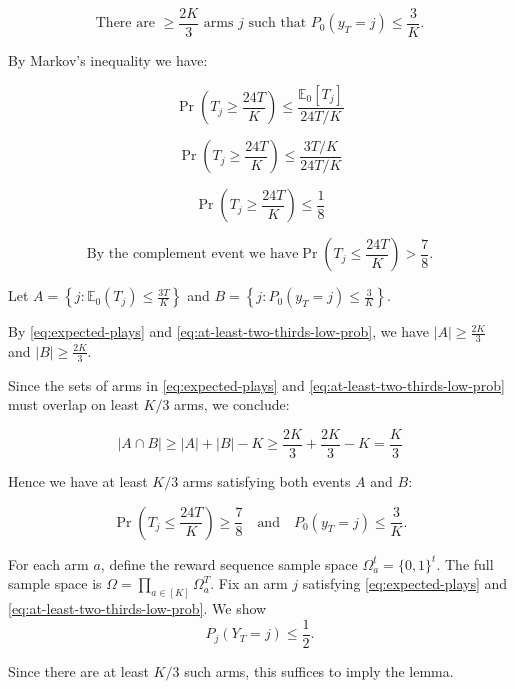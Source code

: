 \documentclass[12pt]{article}
\begin{document}
\begin{equation}
\text{There are } \ge \frac{2K}{3} \text{ arms } j \text{ such that } 
P_0(y_T = j) \le \frac{3}{K}.
\label{eq:at-least-two-thirds-low-prob}
\tag{4.4}
\end{equation}

\noindent By Markov's inequality we have:

\[
\Pr\!\left(T_j \ge \frac{24T}{K}\right) \le \frac{\mathbb{E}_0[T_j]}{24T / K}
\]

\[
\Pr\!\left(T_j \ge \frac{24T}{K}\right) \le \frac{3T / K}{24T / K}
\]

\[
\Pr\!\left(T_j \ge \frac{24T}{K}\right) \le \frac{1}{8}
\]

\[
\text{By the complement event we have} \Pr\!\left(T_j \le \frac{24T}{K}\right) > \frac{7}{8}.
\]

\vspace{5mm}


\noindent Let $A = \left\{j : \mathbb{E}_0(T_j) \leq \frac{3T}{K}\right\}$ and  $B = \left\{j : P_0(y_T = j) \leq \frac{3}{K}\right\}$.

\vspace{5mm}

\noindent By \ref{eq:expected-plays} and \ref{eq:at-least-two-thirds-low-prob}, we have $|A| \geq \frac{2K}{3}$ and $|B| \geq \frac{2K}{3}$.

\noindent Since the sets of arms in \ref{eq:expected-plays} and \ref{eq:at-least-two-thirds-low-prob} must overlap on least $K/3$ arms, we conclude:

\[
|A \cap B| \geq |A| + |B| - K \geq \frac{2K}{3} + \frac{2K}{3} - K = \frac{K}{3}
\]

\noindent Hence we have at least $K/3$ arms satisfying both events $A$ and $B$: 

\[
\Pr\!\left(T_j \le \frac{24T}{K}\right) \ge \frac{7}{8}
\quad \text{and} \quad
P_0(y_T = j) \le \frac{3}{K}.
\]

\noindent For each arm $a$, define the reward sequence sample space 
$\Omega_a^t = \{0,1\}^t$. The full sample space is 
$\Omega = \prod_{a\in[K]} \Omega_a^T$. 
\noindent Fix an arm $j$ satisfying \ref{eq:expected-plays} and \ref{eq:at-least-two-thirds-low-prob}. We show
\begin{equation}
P_j(Y_T = j) \le \frac{1}{2}.
\label{eq:best-arm-leq-half}
\tag{4.5}
\end{equation}

\noindent
Since there are at least $K/3$ such arms, this suffices to imply the lemma.
\end{document}
